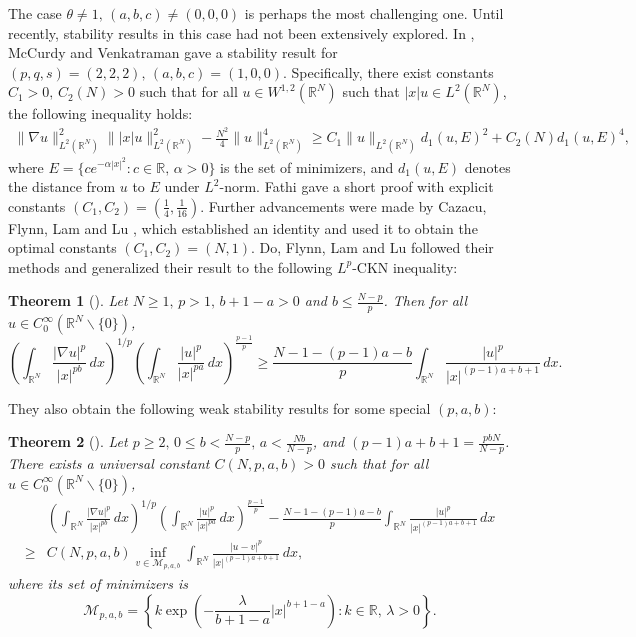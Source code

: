 \documentclass[11pt]{article}
\newtheorem{theorem}{Theorem}[section]
\newcommand{\R}{\mathbb{R}}
\numberwithin{equation}{section}
\begin{document}
The case $\theta\neq 1,\, (a,b,c)\neq (0,0,0)$ is perhaps the most challenging one. Until recently, stability results in this case had not been extensively explored. In \cite{McCurdy2021},  McCurdy and Venkatraman gave a stability result for $(p,q,s)=(2,2,2),\, (a,b,c) = (1,0,0)$. Specifically, there exist constants $C_1>0,\,C_2(N) >0$ such that for all $u\in W^{1,2}(\R^N)$ such that $|x|u\in L^2(\R^N)$, the following inequality holds:
\begin{align*}
    \|\nabla u\|_{L^2(\R^N)}^2\||x|u\|_{L^2(\R^N)}^2 - \frac{N^2}{4}\|u\|_{L^2(\R^N)}^4 \ge C_1\|u\|_{L^2(\R^N)}d_1(u,E)^2 + C_2(N)d_1(u,E)^4,
\end{align*}
where $E=\{ce^{-\alpha|x|^2}:c\in\R,\,\alpha>0\}$ is the set of minimizers, and $d_1(u,E)$ denotes the distance from $u$ to $E$ under $L^2$-norm. Fathi \cite{Fathi2021} gave a short proof with explicit constants $(C_1,C_2)=(\frac 14, \frac 1{16})$. Further advancements were made by Cazacu, Flynn, Lam and Lu \cite{Cazacu2024}, which established an identity and used it to obtain the optimal constants $(C_1,C_2) = (N,1)$. Do, Flynn, Lam and Lu \cite{Do2023} followed their methods and generalized their result to the following $L^p$-CKN inequality:
\begin{theorem}[{\cite[Corollary 1.2]{Do2023}}]
    Let $N\ge 1,\, p>1,\, b+1-a>0$ and $b\le \frac{N-p}{p}$. Then for all $u\in C_0^\infty(\R^N\backslash\{0\})$,
    \begin{equation}\label{CKN}
        \left(\int_{\R^N} \frac{|\nabla u|^p}{|x|^{pb}}\,dx\right)^{1/p}\left(\int_{\R^N} \frac{|u|^p}{|x|^{pa}}\,dx\right)^{\frac{p-1}{p}} \ge \frac{N-1-(p-1)a-b}{p} \int_{\R^N} \frac{|u|^p}{|x|^{(p-1)a+b+1}}\,dx.
    \end{equation}
\end{theorem}
They also obtain the following  weak stability results for some special $(p,a,b)$:
\begin{theorem}[{\cite[Theorem 1.9]{Do2023}}]\label{Do's Thm}
    Let $p\ge 2,\, 0\le b <\frac{N-p}{p},\, a<\frac{Nb}{N-p}$, and $(p-1)a+b+1=\frac{pbN}{N-p}$. There exists a universal constant $C(N,p,a,b)>0$ such that for all $u\in C_0^\infty(\R^N\backslash\{0\})$,
    \begin{equation}\label{weak stability}
        \begin{aligned}
            & \left(\int_{\R^N} \frac{|\nabla u|^p}{|x|^{pb}}\,dx\right)^{1/p}\left(\int_{\R^N} \frac{|u|^p}{|x|^{pa}}\,dx\right)^{\frac{p-1}{p}} - \frac{N-1-(p-1)a-b}{p} \int_{\R^N} \frac{|u|^p}{|x|^{(p-1)a+b+1}}\,dx\\
            \ge{}& C(N,p,a,b) \inf_{v\in \mathcal M_{p,a,b}} \int_{\R^N} \frac{|u-v|^p}{|x|^{(p-1)a+b+1}}\,dx,
        \end{aligned}
    \end{equation}
    where its set of minimizers is
    \[ \mathcal{M}_{p,a,b} =\left\{k\exp\left(-\frac{\lambda}{b+1-a}|x|^{b+1-a}\right):k\in \R,\,\lambda>0\right\}.\]
\end{theorem}
\end{document}
